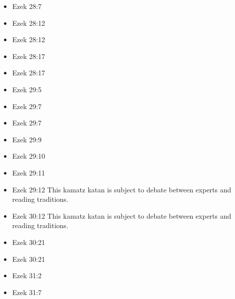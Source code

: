 \documentclass[14pt]{book}
\begin{document}
\begin{multicols}{2}
\begin{itemize}
												\item Ezek 28:7
												
												\item Ezek 28:12
												
												\item Ezek 28:12
												
												\item Ezek 28:17
												
												\item Ezek 28:17
												
												\item Ezek 29:5
												
												\item Ezek 29:7
														
														\item Ezek 29:7
														
														\item Ezek 29:9
														
														\item Ezek 29:10
														
														\item Ezek 29:11
														
														\item Ezek 29:12 This kamatz katan is subject to debate between experts and reading traditions.
														
														\item Ezek 30:12 This kamatz katan is subject to debate between experts and reading traditions.
														
														\item Ezek 30:21
														
														\item Ezek 30:21
														
														\item Ezek 31:2
														
														\item Ezek 31:7
														

\end{itemize}
\end{multicols}
\end{document}
